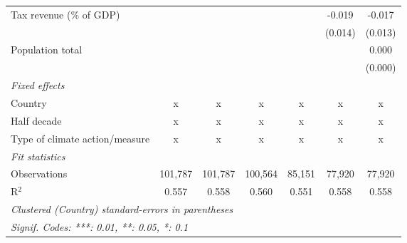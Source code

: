 \begin{tabular}{lcccccc}
   Tax revenue (\% of GDP)                     &         &               &              &              & -0.019       & -0.017\\   
                                               &         &               &              &              & (0.014)      & (0.013)\\   
   Population total                            &         &               &              &              &              & 0.000\\   
                                               &         &               &              &              &              & (0.000)\\   
   \emph{Fixed effects}\\
   Country                                     & x       & x             & x            & x            & x            & x\\  
   Half decade                                 & x       & x             & x            & x            & x            & x\\  
   Type of climate action/measure              & x       & x             & x            & x            & x            & x\\  
   \midrule \emph{Fit statistics}\\
   Observations                                & 101,787 & 101,787       & 100,564      & 85,151       & 77,920       & 77,920\\  
   R$^2$                                       & 0.557   & 0.558         & 0.560        & 0.551        & 0.558        & 0.558\\  
   \midrule
   \multicolumn{7}{l}{\emph{Clustered (Country) standard-errors in parentheses}}\\
   \multicolumn{7}{l}{\emph{Signif. Codes: ***: 0.01, **: 0.05, *: 0.1}}\\
\end{tabular}
\par\endgroup


